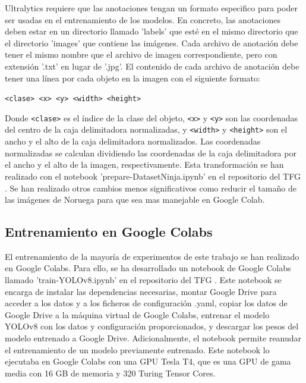 Ultralytics requiere que las anotaciones tengan un formato especifico para poder ser usadas en el entrenamiento de los modelos. En concreto, las anotaciones deben estar en un directorio llamado 'labels' que esté en el mismo directorio que el directorio 'images' que contiene las imágenes. Cada archivo de anotación debe tener el mismo nombre que el archivo de imagen correspondiente, pero con extensión '.txt' en lugar de '.jpg'. El contenido de cada archivo de anotación debe tener una línea por cada objeto en la imagen con el siguiente formato:
\begin{center}
    \texttt{<clase> <x> <y> <width> <height>}
\end{center}
Donde \texttt{<clase>} es el índice de la clase del objeto, \texttt{<x>} y \texttt{<y>} son las coordenadas del centro de la caja delimitadora normalizadas, y \texttt{<width>} y \texttt{<height>} son el ancho y el alto de la caja delimitadora normalizados. Las coordenadas normalizadas se calculan dividiendo las coordenadas de la caja delimitadora por el ancho y el alto de la imagen, respectivamente. Esta transformación se han realizado con el notebook 'prepare-DatasetNinja.ipynb' en el repositorio del TFG \cite{TFG_Repository}. Se han realizado otros cambios menos significativos como reducir el tamaño de las imágenes de Noruega para que sea mas manejable en Google Colab.

\subsection{Entrenamiento en Google Colabs}
El entrenamiento de la mayoría de experimentos de este trabajo se han realizado en Google Colabs. Para ello, se ha desarrollado un notebook de Google Colabs llamado 'train-YOLOv8.ipynb' en el repositorio del TFG \cite{TFG_Repository}. Este notebook se encarga de instalar las dependencias necesarias, montar Google Drive para acceder a los datos y a los ficheros de configuración .yaml, copiar los datos de Google Drive a la máquina virtual de Google Colabs, entrenar el modelo YOLOv8 con los datos y configuración proporcionados, y descargar los pesos del modelo entrenado a Google Drive. Adicionalmente, el notebook permite reanudar el entrenamiento de un modelo previamente entrenado. Este notebook lo ejecutaba en Google Colabs con una GPU Tesla T4, que es una GPU de gama media con 16 GB de memoria y 320 Turing Tensor Cores.


